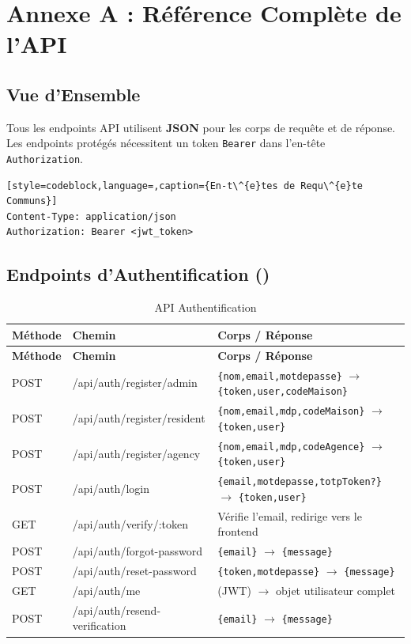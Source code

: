 \chapter{Annexe A : Référence Complète de l'API}

\section{Vue d'Ensemble}

Tous les endpoints API utilisent \textbf{JSON} pour les corps de requête et de réponse.
Les endpoints protégés nécessitent un token \texttt{Bearer} dans l'en-tête
\texttt{Authorization}.

\begin{lstlisting}[style=codeblock,language=,caption={En-t\^{e}tes de Requ\^{e}te Communs}]
Content-Type: application/json
Authorization: Bearer <jwt_token>
\end{lstlisting}

\section{Endpoints d'Authentification ()}

\begin{longtable}{p{} p{} p{}}
\caption{API Authentification}\label{tab:api_auth}\\
\toprule
\textbf{Méthode} & \textbf{Chemin} & \textbf{Corps / Réponse} \\
\midrule
\endfirsthead
\toprule
\textbf{Méthode} & \textbf{Chemin} & \textbf{Corps / Réponse} \\
\midrule
\endhead
\bottomrule
\endfoot
POST & /api/auth/register/admin    & \texttt{\{nom,email,motdepasse\}} $\to$ \texttt{\{token,user,codeMaison\}} \\
POST & /api/auth/register/resident & \texttt{\{nom,email,mdp,codeMaison\}} $\to$ \texttt{\{token,user\}} \\
POST & /api/auth/register/agency   & \texttt{\{nom,email,mdp,codeAgence\}} $\to$ \texttt{\{token,user\}} \\
POST & /api/auth/login             & \texttt{\{email,motdepasse,totpToken?\}} $\to$ \texttt{\{token,user\}} \\
GET  & /api/auth/verify/:token     & Vérifie l'email, redirige vers le frontend \\
POST & /api/auth/forgot-password   & \texttt{\{email\}} $\to$ \texttt{\{message\}} \\
POST & /api/auth/reset-password    & \texttt{\{token,motdepasse\}} $\to$ \texttt{\{message\}} \\
GET  & /api/auth/me                & (JWT) $\to$ objet utilisateur complet \\
POST & /api/auth/resend-verification & \texttt{\{email\}} $\to$ \texttt{\{message\}} \\
\end{longtable}

